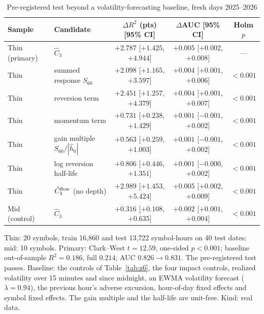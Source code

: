 \documentclass[12pt]{article}
\theoremstyle{definition}
\theoremstyle{remark}
\begin{document}
\begin{table}[t]\centering
\begin{threeparttable}
\caption{Pre-registered test beyond a volatility-forecasting baseline, fresh days 2025--2026}\label{tab:z9}
\small\setlength{\tabcolsep}{2.5pt}
\begin{tabular}{lp{}ccc}
\toprule
Sample & Candidate & $\Delta R^2$ (pts) [95\% CI] & $\Delta$AUC [95\% CI] & Holm $p$\\
\midrule
Thin (primary) & $\hat C_3$ & $+2.787$ [$+1.425$, $+4.944$] & $+0.005$ [$+0.002$, $+0.008$] & ---\\
Thin & summed response $S_{60}$ & $+2.098$ [$+1.165$, $+3.597$] & $+0.004$ [$+0.001$, $+0.006$] & $<0.001$\\
Thin & reversion term & $+2.451$ [$+1.257$, $+4.379$] & $+0.004$ [$+0.001$, $+0.007$] & $<0.001$\\
Thin & momentum term & $+0.731$ [$+0.238$, $+1.429$] & $+0.001$ [$-0.001$, $+0.002$] & $<0.001$\\
Thin & gain multiple $S_{60}/|\hat h_0|$ & $+0.563$ [$+0.259$, $+1.003$] & $+0.001$ [$-0.001$, $+0.002$] & $<0.001$\\
Thin & log reversion half-life & $+0.806$ [$+0.446$, $+1.351$] & $+0.001$ [$-0.000$, $+0.002$] & $<0.001$\\
Thin & $\hat C_3^{\rm flow}$ (no depth) & $+2.989$ [$+1.453$, $+5.424$] & $+0.005$ [$+0.002$, $+0.009$] & $<0.001$\\
Mid (control) & $\hat C_3$ & $+0.316$ [$+0.108$, $+0.635$] & $+0.002$ [$+0.001$, $+0.004$] & $<0.001$\\
\bottomrule
\end{tabular}
\begin{tablenotes}\footnotesize\item Thin: 20 symbols, train 16{,}860 and test 13{,}722 symbol-hours on 40 test dates; mid: 10 symbols. Primary: Clark--West $t=12.59$, one-sided $p<0.001$; baseline out-of-sample $R^2=0.186$, full $0.214$; AUC $0.826\to0.831$. The pre-registered test passes. Baseline: the controls of Table~\ref{tab:z6}, the four impact controls, realized volatility over 15 minutes and since midnight, an EWMA volatility forecast ($\lambda=0.94$), the previous hour's adverse excursion, hour-of-day fixed effects and symbol fixed effects. The gain multiple and the half-life are unit-free. Kind: real data.\end{tablenotes}
\end{threeparttable}
\end{table}
\end{document}
